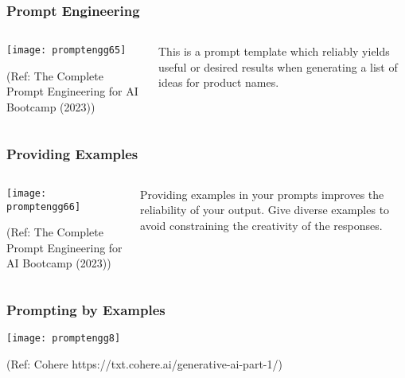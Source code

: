 \begin{frame}[fragile]\frametitle{Prompt Engineering}

\begin{columns}
    \begin{column}[T]{0.6\linewidth}
		\begin{center}
		\texttt{[image: promptengg65]}

		{\tiny (Ref: The Complete Prompt Engineering for AI Bootcamp (2023))}
		\end{center}	
    \end{column}
    \begin{column}[T]{0.4\linewidth}
		This is a prompt template which reliably yields useful or desired results when
generating a list of ideas for product names.
    \end{column}
  \end{columns}
\end{frame}

\begin{frame}[fragile]\frametitle{Providing Examples}

\begin{columns}
    \begin{column}[T]{0.6\linewidth}
		\begin{center}
		\texttt{[image: promptengg66]}

		{\tiny (Ref: The Complete Prompt Engineering for AI Bootcamp (2023))}
		\end{center}	
    \end{column}
    \begin{column}[T]{0.4\linewidth}
		Providing examples in your prompts improves the reliability of your output.
		Give diverse examples to avoid constraining the creativity of the responses.
    \end{column}
  \end{columns}
\end{frame}


\begin{frame}[fragile]\frametitle{Prompting by Examples}

\begin{center}
\texttt{[image: promptengg8]}

{\tiny (Ref: Cohere https://txt.cohere.ai/generative-ai-part-1/)}

\end{center}		
		


\end{frame}

